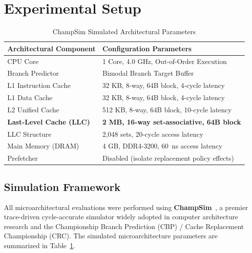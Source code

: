 \documentclass[conference]{IEEEtran}
\begin{document}
\section{Experimental Setup}

\begin{table}[!t]
\centering
\caption{ChampSim Simulated Architectural Parameters}
\label{tab:arch_params}
\begin{tabularx}{\columnwidth}{lX}
\toprule
\textbf{Architectural Component} & \textbf{Configuration Parameters} \\
\midrule
CPU Core & 1 Core, 4.0 GHz, Out-of-Order Execution \\
Branch Predictor & Bimodal Branch Target Buffer \\
L1 Instruction Cache & 32 KB, 8-way, 64B block, 4-cycle latency \\
L1 Data Cache & 32 KB, 8-way, 64B block, 4-cycle latency \\
L2 Unified Cache & 512 KB, 8-way, 64B block, 10-cycle latency \\
\textbf{Last-Level Cache (LLC)} & \textbf{2 MB, 16-way set-associative, 64B block} \\
LLC Structure & 2,048 sets, 20-cycle access latency \\
Main Memory (DRAM) & 4 GB, DDR4-3200, 60~ns access latency \\
Prefetcher & Disabled (isolate replacement policy effects) \\
\bottomrule
\end{tabularx}
\end{table}

\subsection{Simulation Framework}
All microarchitectural evaluations were performed using \textbf{ChampSim}~\cite{champsim}, a premier trace-driven cycle-accurate simulator widely adopted in computer architecture research and the Championship Branch Prediction (CBP) / Cache Replacement Championship (CRC). The simulated microarchitecture parameters are summarized in Table~\ref{tab:arch_params}.
\end{document}
